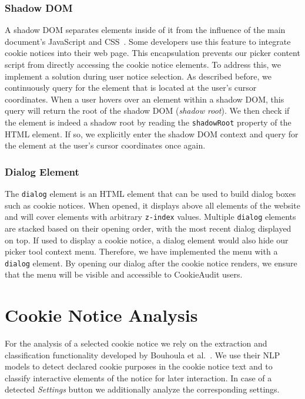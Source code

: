 \subsubsection{Shadow DOM}
A shadow DOM separates elements inside of it from the influence of the main document's JavaScript and CSS~\cite{shadowDomMdn}.
Some developers use this feature to integrate cookie notices into their web page.
This encapsulation prevents our picker content script from directly accessing the cookie notice elements. 
To address this, we implement a solution during user notice selection.
As described before, we continuously query for the element that is located at the user's cursor coordinates.
When a user hovers over an element within a shadow DOM, this query will return the root of the shadow DOM (\emph{shadow root}). 
We then check if the element is indeed a shadow root by reading the \verb|shadowRoot| property of the HTML element.
If so, we explicitly enter the shadow DOM context and query for the element at the user's cursor coordinates once again. 

\subsubsection{Dialog Element}
The \verb|dialog| element is an HTML element that can be used to build dialog boxes such as cookie notices.
When opened, it displays above all elements of the website and will cover elements with arbitrary \verb|z-index| values. 
Multiple \verb|dialog| elements are stacked based on their opening order, with the most recent dialog displayed on top.
If used to display a cookie notice, a dialog element would also hide our picker tool context menu.
Therefore, we have implemented the menu with a \verb|dialog| element.
By opening our dialog after the cookie notice renders, we ensure that the menu will be visible and accessible to CookieAudit users.

\section{Cookie Notice Analysis}
For the analysis of a selected cookie notice we rely on the  extraction and classification functionality developed by Bouhoula et al.~\cite{bouhoula2023automated}.
We use their NLP models to detect declared cookie purposes in the cookie notice text and to classify interactive elements of the notice for later interaction.
In case of a detected \emph{Settings} button we additionally analyze the corresponding settings.

